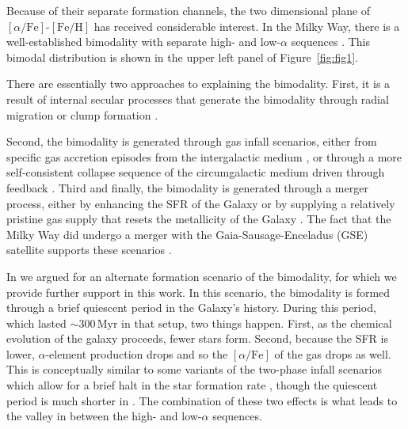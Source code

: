 \documentclass[linenumbers, twocolumn]{aastex631}
\newcommand{\Myr}{\ensuremath{\textrm{Myr}}}
\newcommand{\FeH}{\ensuremath{[\textrm{Fe}/\textrm{H}]}}
\newcommand{\alphaFe}{\ensuremath{[\alpha/\textrm{Fe}]}}
\begin{document}
Because of their separate formation channels, the two dimensional plane of \alphaFe{}-\FeH{} has received considerable interest. In the Milky Way, there is a well-established bimodality with separate high- and low-$\alpha$ sequences \citep{1996ASPC...92..307G,1998A&A...338..161F,2004AN....325....3F,2006MNRAS.367.1329R,2011A&A...535L..11A,2012A&A...545A..32A,2014A&A...562A..71B,2014ApJ...796...38N,2020MNRAS.493.2952H}. This bimodal distribution is shown in the upper left panel of Figure~\ref{fig:fig1}.

There are essentially two approaches to explaining the bimodality. First, it is a result of internal secular processes that generate the bimodality through radial migration \citep{2009MNRAS.396..203S,2021MNRAS.507.5882S,2023MNRAS.523.3791C} or clump formation \citep{2019MNRAS.484.3476C,2020MNRAS.492.4716B,2021MNRAS.502..260B,2023ApJ...953..128G}.

Second, the bimodality is generated through gas infall scenarios, either from specific gas accretion episodes from the intergalactic medium \citep{1997ApJ...477..765C,2009IAUS..254..191C,2017MNRAS.472.3637G,2019A&A...623A..60S}, or through a more self-consistent collapse sequence of the circumgalactic medium driven through feedback \citep{2021MNRAS.501.5176K}. Third and finally, the bimodality is generated through a merger process, either by enhancing the SFR of the Galaxy \citep{2004ApJ...612..894B,2005ApJ...630..298B,2007ApJ...658...60B,2010MNRAS.402.1489R} or by supplying a relatively pristine gas supply that resets the metallicity of the Galaxy \citep{2020MNRAS.491.5435B,2024MNRAS.528L.122C}. The fact that the Milky Way did undergo a merger with the Gaia-Sausage-Enceladus (GSE) satellite supports these scenarios \citep{2018MNRAS.478..611B,2018Natur.563...85H,2020ApJ...901...48N,2024ApJ...972..112C}.

In \citet{2024arXiv240707985B} we argued for an alternate formation scenario of the bimodality, for which we provide further support in this work. In this scenario, the bimodality is formed through a brief quiescent period in the Galaxy's history. During this period, which lasted $\sim300\,\Myr$ in that setup, two things happen. First, as the chemical evolution of the galaxy proceeds, fewer stars form. Second, because the SFR is lower, $\alpha$-element production drops and so the \alphaFe{} of the gas drops as well. This is conceptually similar to some variants of the two-phase infall scenarios which allow for a brief halt in the star formation rate \citep[][and references therein]{2024arXiv240511025S}, though the quiescent period is much shorter in \citet{2024arXiv240707985B}. The combination of these two effects is what leads to the valley in between the high- and low-$\alpha$ sequences.
\end{document}
